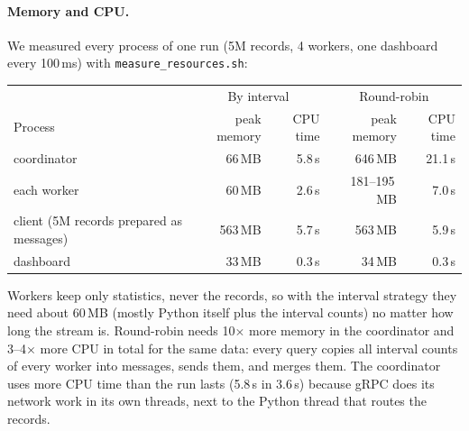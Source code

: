 \documentclass[10pt,a4paper]{article}
\newcommand{\code}[1]{\texttt{#1}}
\begin{document}
\paragraph{Memory and CPU.}
We measured every process of one run (5M records, 4 workers, one dashboard every 100\,ms) with \code{measure\_resources.sh}:
\begin{center}\small
\begin{tabular}{lrrrr}
\toprule
 & \multicolumn{2}{c}{By interval} & \multicolumn{2}{c}{Round-robin} \\
Process & peak memory & CPU time & peak memory & CPU time \\
\midrule
coordinator & 66\,MB & 5.8\,s & 646\,MB & 21.1\,s \\
each worker & 60\,MB & 2.6\,s & 181--195\,MB & 7.0\,s \\
client (5M records prepared as messages) & 563\,MB & 5.7\,s & 563\,MB & 5.9\,s \\
dashboard & 33\,MB & 0.3\,s & 34\,MB & 0.3\,s \\
\bottomrule
\end{tabular}
\end{center}
Workers keep only statistics, never the records, so with the interval strategy they need about 60\,MB (mostly Python itself
plus the interval counts) no matter how long the stream is. Round-robin needs 10$\times$ more memory in the coordinator and
3--4$\times$ more CPU in total for the same data: every query copies all interval counts of every worker into messages, sends
them, and merges them. The coordinator uses more CPU time than the run lasts (5.8\,s in 3.6\,s) because gRPC does its network work
in its own threads, next to the Python thread that routes the records.
\end{document}
